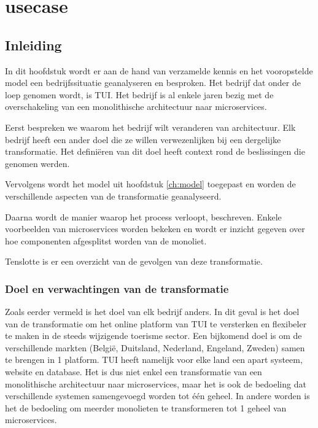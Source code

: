 
\chapter{usecase}
\label{ch:usecase}

\section{Inleiding}

In dit hoofdstuk wordt er aan de hand van verzamelde kennis en het vooropstelde model een bedrijfssituatie geanalyseren en besproken. Het bedrijf dat onder de loep genomen wordt, is TUI. Het bedrijf is al enkele jaren bezig met de overschakeling van een monolithische architectuur naar microservices. 

Eerst bespreken we waarom het bedrijf wilt veranderen van architectuur. Elk bedrijf heeft een ander doel die ze willen verwezenlijken bij een dergelijke transformatie. Het definiëren van dit doel heeft context rond de beslissingen die genomen werden.

Vervolgens wordt het model uit hoofdstuk \ref{ch:model} toegepast en worden de verschillende aspecten van de transformatie geanalyseerd.

Daarna wordt de manier waarop het process verloopt, beschreven. Enkele voorbeelden van microservices worden bekeken en wordt er inzicht gegeven over hoe componenten afgesplitst worden van de monoliet. 

Tenslotte is er een overzicht van de gevolgen van deze transformatie.

\subsection{Doel en verwachtingen van de transformatie}

Zoals eerder vermeld is het doel van elk bedrijf anders. In dit geval is het doel van de transformatie om het online platform van TUI te versterken en flexibeler te maken in de steeds wijzigende toerisme sector. Een bijkomend doel is om de verschillende markten (België, Duitsland, Nederland, Engeland, Zweden) samen te brengen in 1 platform. TUI heeft namelijk voor elke land een apart systeem, website en database. Het is dus niet enkel een transformatie van een monolithische architectuur naar microservices, maar het is ook de bedoeling dat verschillende systemen samengevoegd worden tot één geheel. In andere worden is het de bedoeling om meerder monolieten te transformeren tot 1 geheel van microservices.  

